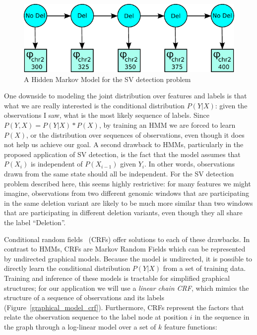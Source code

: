 \begin{figure}
\centering
\includegraphics[width=.8\textwidth]{figures/graphical-model-1.pdf}
\caption{A Hidden Markov Model for the SV detection problem}
\label{graphical_model_hmm}
\end{figure}

One downside to modeling the joint distribution over features and labels is that what we are really interested is the conditional distribution $P(Y|X)$: given the observations I saw, what is the most likely sequence of labels. Since $P(Y,X) = P(Y|X) * P(X)$, by training an HMM we are forced to learn $P(X)$, or the distribution over sequences of observations, even though it does not help us achieve our goal. A second drawback to HMMs, particularly in the proposed application of SV detection, is the fact that the model assumes that $P(X_i)$ is independent of $P(X_{i-1})$ given $Y_i$. In other words, observations drawn from the same state should all be independent. For the SV detection problem described here, this seems highly restrictive: for many features we might imagine, observations from two different genomic windows that are participating in the same deletion variant are likely to be much more similar than two windows that are participating in different deletion variants, even though they all share the label ``Deletion''. 

Conditional random fields~\cite{Lafferty:2001:CRF:645530.655813} (CRFs) offer solutions to each of these drawbacks. In contrast to HMMs, CRFs are Markov Random Fields which can be represented by undirected graphical models. Because the model is undirected, it is possible to directly learn the conditional distribution $P(Y|X)$ from a set of training data. Training and inference of these models is tractable for simplified graphical structures; for our application we will use a \emph{linear chain CRF}, which mimics the structure of a sequence of observations and its labels (Figure~\ref{graphical_model_crf}). Furthermore, CRFs represent the factors that relate the observation sequence to the label node at position $i$ in the sequence in the graph through a log-linear model over a set of $k$ feature functions:

